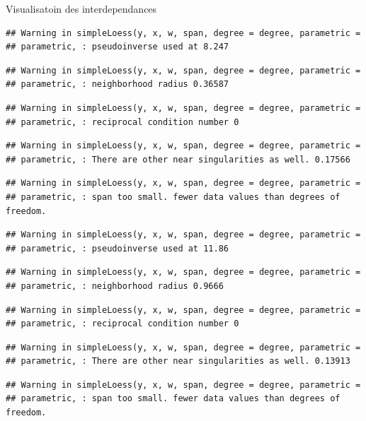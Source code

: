 \documentclass[11pt,ignorenonframetext,]{beamer}
\begin{document}
\begin{frame}[fragile]{Visualisatoin des interdependances}
\begin{verbatim}
## Warning in simpleLoess(y, x, w, span, degree = degree, parametric =
## parametric, : pseudoinverse used at 8.247
\end{verbatim}

\begin{verbatim}
## Warning in simpleLoess(y, x, w, span, degree = degree, parametric =
## parametric, : neighborhood radius 0.36587
\end{verbatim}

\begin{verbatim}
## Warning in simpleLoess(y, x, w, span, degree = degree, parametric =
## parametric, : reciprocal condition number 0
\end{verbatim}

\begin{verbatim}
## Warning in simpleLoess(y, x, w, span, degree = degree, parametric =
## parametric, : There are other near singularities as well. 0.17566
\end{verbatim}

\begin{verbatim}
## Warning in simpleLoess(y, x, w, span, degree = degree, parametric =
## parametric, : span too small. fewer data values than degrees of freedom.
\end{verbatim}

\begin{verbatim}
## Warning in simpleLoess(y, x, w, span, degree = degree, parametric =
## parametric, : pseudoinverse used at 11.86
\end{verbatim}

\begin{verbatim}
## Warning in simpleLoess(y, x, w, span, degree = degree, parametric =
## parametric, : neighborhood radius 0.9666
\end{verbatim}

\begin{verbatim}
## Warning in simpleLoess(y, x, w, span, degree = degree, parametric =
## parametric, : reciprocal condition number 0
\end{verbatim}

\begin{verbatim}
## Warning in simpleLoess(y, x, w, span, degree = degree, parametric =
## parametric, : There are other near singularities as well. 0.13913
\end{verbatim}

\begin{verbatim}
## Warning in simpleLoess(y, x, w, span, degree = degree, parametric =
## parametric, : span too small. fewer data values than degrees of freedom.
\end{verbatim}


\end{frame}
\end{document}
